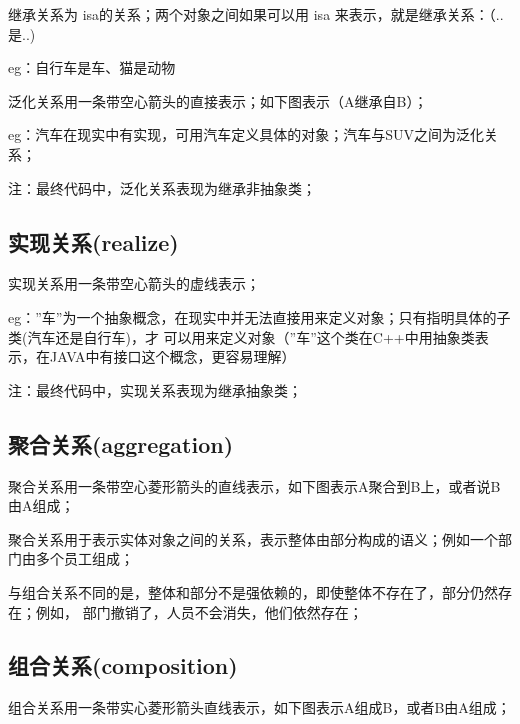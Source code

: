 \documentclass[letterpaper,10pt,english]{sphinxmanual}
\begin{document}
\sphinxAtStartPar
继承关系为 is\sphinxhyphen{}a的关系；两个对象之间如果可以用 is\sphinxhyphen{}a 来表示，就是继承关系：（..是..)

\sphinxAtStartPar
eg：自行车是车、猫是动物

\sphinxAtStartPar
泛化关系用一条带空心箭头的直接表示；如下图表示（A继承自B）；

\noindent{}

\sphinxAtStartPar
eg：汽车在现实中有实现，可用汽车定义具体的对象；汽车与SUV之间为泛化关系；

\noindent{}

\sphinxAtStartPar
注：最终代码中，泛化关系表现为继承非抽象类；


\subsection{实现关系(realize)}
\label{\detokenize{read_uml:realize}}
\sphinxAtStartPar
实现关系用一条带空心箭头的虚线表示；

\sphinxAtStartPar
eg：”车”为一个抽象概念，在现实中并无法直接用来定义对象；只有指明具体的子类(汽车还是自行车)，才
可以用来定义对象（”车”这个类在C++中用抽象类表示，在JAVA中有接口这个概念，更容易理解）

\noindent{}

\sphinxAtStartPar
注：最终代码中，实现关系表现为继承抽象类；


\subsection{聚合关系(aggregation)}
\label{\detokenize{read_uml:aggregation}}
\sphinxAtStartPar
聚合关系用一条带空心菱形箭头的直线表示，如下图表示A聚合到B上，或者说B由A组成；

\noindent{}

\sphinxAtStartPar
聚合关系用于表示实体对象之间的关系，表示整体由部分构成的语义；例如一个部门由多个员工组成；

\sphinxAtStartPar
与组合关系不同的是，整体和部分不是强依赖的，即使整体不存在了，部分仍然存在；例如，
部门撤销了，人员不会消失，他们依然存在；


\subsection{组合关系(composition)}
\label{\detokenize{read_uml:composition}}
\sphinxAtStartPar
组合关系用一条带实心菱形箭头直线表示，如下图表示A组成B，或者B由A组成；
\end{document}
